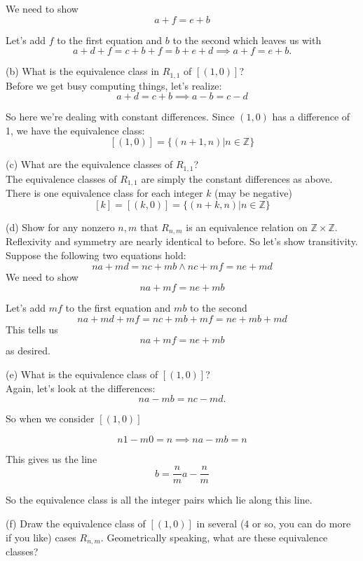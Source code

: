 \documentclass[16 pt]{amsart}
\theoremstyle{definition}
\theoremstyle{remark}
\numberwithin{equation}{subsection}
\newcommand{\Z}{\mathbb{Z}}
\begin{document}
We need to show 
\[
a+f = e+b
\]

Let's add $f$ to the first equation and $b$ to the second which leaves us with
\[
a+d+f = c+b+f = b+e+d \implies a+f = e+b.
\]


(b) What is the equivalence class in $R_{1,1}$ of $[(1,0)]$?\\


Before we get busy computing things, let's realize:
\[
a+d = c+b \implies a-b = c-d
\]

So here we're dealing with constant differences.
Since $(1,0)$ has a difference of 1, we have the equivalence class:
\[
[(1,0)] = \{(n+1,n) | n\in \Z\}
\]



(c) What are the equivalence classes of $R_{1,1}$?\\

The equivalence classes of $R_{1,1}$ are simply the constant differences as above.  There is one equivalence class for each integer $k$ (may be negative)
\[
[k] = [(k,0)] = \{(n+k,n)|n\in\Z\}
\]




(d) Show for any nonzero $n,m$ that $R_{n,m}$ is an equivalence relation on $\Z\times\Z$.\\

Reflexivity and symmetry are nearly identical to before.  So let's show transitivity.  Suppose the following two equations hold:
\[
na+md = nc+mb \wedge nc + mf = ne + md
\]
We need to show
\[
na + mf = ne+mb
\]


Let's add $mf$ to the first equation and $mb$ to the second 
\[
na + md + mf = nc + mb + mf = ne + mb + md
\]
This tells us
\[
na + mf = ne + mb 
\]
as desired.



(e) What is the equivalence class of $[(1,0)]$?\\


Again, let's look at the differences:
\[
na - mb = nc - md.
\]

So when we consider $[(1,0)]$

\[
n1 - m0 = n \implies na - mb = n
\]

This gives us the line 
\[
b = \frac{n}{m}a - \frac{n}{m}
\]

So the equivalence class is all the integer pairs which lie along this line.




(f) Draw the equivalence class of $[(1,0)]$ in several (4 or so, you can do more if you like) cases $R_{n,m}$.  Geometrically speaking, what are these equivalence classes?
\end{document}
